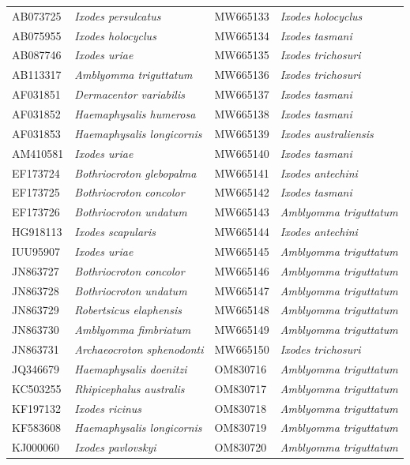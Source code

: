 \documentclass[a4paper, nobind]{templates/ociamthesis}
\begin{document}
\begin{longtable}[t]{l>{}l|l>{}l}
\endfoot
\bottomrule
\endlastfoot
AB073725 & \em{Ixodes persulcatus} & MW665133 & \em{Ixodes holocyclus}\\
AB075955 & \em{Ixodes holocyclus} & MW665134 & \em{Ixodes tasmani}\\
AB087746 & \em{Ixodes uriae} & MW665135 & \em{Ixodes trichosuri}\\
AB113317 & \em{Amblyomma triguttatum} & MW665136 & \em{Ixodes trichosuri}\\
AF031851 & \em{Dermacentor variabilis} & MW665137 & \em{Ixodes tasmani}\\
AF031852 & \em{Haemaphysalis humerosa} & MW665138 & \em{Ixodes tasmani}\\
AF031853 & \em{Haemaphysalis longicornis} & MW665139 & \em{Ixodes australiensis}\\
AM410581 & \em{Ixodes uriae} & MW665140 & \em{Ixodes tasmani}\\
EF173724 & \em{Bothriocroton glebopalma} & MW665141 & \em{Ixodes antechini}\\
EF173725 & \em{Bothriocroton concolor} & MW665142 & \em{Ixodes tasmani}\\
EF173726 & \em{Bothriocroton undatum} & MW665143 & \em{Amblyomma triguttatum}\\
HG918113 & \em{Ixodes scapularis} & MW665144 & \em{Ixodes antechini}\\
IUU95907 & \em{Ixodes uriae} & MW665145 & \em{Amblyomma triguttatum}\\
JN863727 & \em{Bothriocroton concolor} & MW665146 & \em{Amblyomma triguttatum}\\
JN863728 & \em{Bothriocroton undatum} & MW665147 & \em{Amblyomma triguttatum}\\
JN863729 & \em{Robertsicus elaphensis} & MW665148 & \em{Amblyomma triguttatum}\\
JN863730 & \em{Amblyomma fimbriatum} & MW665149 & \em{Amblyomma triguttatum}\\
JN863731 & \em{Archaeocroton sphenodonti} & MW665150 & \em{Ixodes trichosuri}\\
JQ346679 & \em{Haemaphysalis doenitzi} & OM830716 & \em{Amblyomma triguttatum}\\
KC503255 & \em{Rhipicephalus australis} & OM830717 & \em{Amblyomma triguttatum}\\
KF197132 & \em{Ixodes ricinus} & OM830718 & \em{Amblyomma triguttatum}\\
KF583608 & \em{Haemaphysalis longicornis} & OM830719 & \em{Amblyomma triguttatum}\\
KJ000060 & \em{Ixodes pavlovskyi} & OM830720 & \em{Amblyomma triguttatum}\\

\end{longtable}
\end{document}
